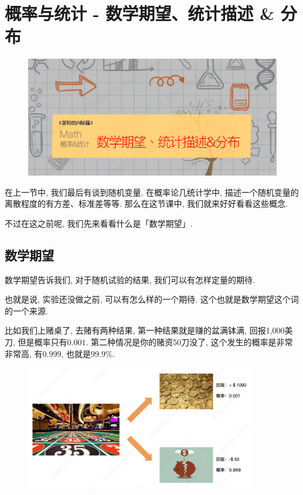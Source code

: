 \chapter{概率与统计 - 数学期望、统计描述 \& 分布}

\begin{figure}[ht]
  \centering
  \includegraphics[width=1\textwidth]{asset/茶桁的AI秘籍_Math_21.png}
\end{figure}
\newpage


在上一节中, 我们最后有谈到随机变量. 在概率论几统计学中, 描述一个随机变量的离散程度的有方差、标准差等等. 那么在这节课中, 我们就来好好看看这些概念. 

不过在这之前呢, 我们先来看看什么是「数学期望」. 

\section{数学期望}

数学期望告诉我们, 对于随机试验的结果, 我们可以有怎样定量的期待. 

也就是说, 实验还没做之前, 可以有怎么样的一个期待. 这个也就是数学期望这个词的一个来源. 

比如我们上赌桌了, 去赌有两种结果, 第一种结果就是赚的盆满钵满, 回报1,000美刀, 但是概率只有$0.001$. 第二种情况是你的赌资50刀没了, 这个发生的概率是非常非常高, 有$0.999$, 也就是$99.9\%$. 

\begin{figure}[ht]
  \centering
  \includegraphics[width=0.9\textwidth]{asset/20230826212939.png}
  \caption{}
  \label{fig:img22_1}
\end{figure}

